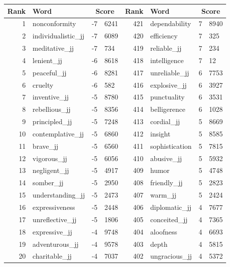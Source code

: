 \begin{table}[tbp]
    \begin{tabular}{| rlr@{.}l | rlr@{.}l |}
    \hline
    \textbf{Rank} & \textbf{Word} & \multicolumn{2}{c|}{\textbf{Score}} & \textbf{Rank} & \textbf{Word} & \multicolumn{2}{c|}{\textbf{Score}} \\
    \hline
    1 & nonconformity & -7 & 6241    &    421 & dependability & 7 & 8940 \\
    2 & individualistic\_jj & -7 & 6089    &    420 & efficiency & 7 & 325 \\
    3 & meditative\_jj & -7 & 734    &    419 & reliable\_jj & 7 & 234 \\
    4 & lenient\_jj & -6 & 8618    &    418 & intelligence & 7 & 12 \\
    5 & peaceful\_jj & -6 & 8281    &    417 & unreliable\_jj & 6 & 7753 \\
    6 & cruelty & -6 & 582    &    416 & explosive\_jj & 6 & 3927 \\
    7 & inventive\_jj & -5 & 8780    &    415 & punctuality & 6 & 3531 \\
    8 & rebellious\_jj & -5 & 8356    &    414 & belligerence & 6 & 1028 \\
    9 & principled\_jj & -5 & 7248    &    413 & cordial\_jj & 5 & 8669 \\
    10 & contemplative\_jj & -5 & 6860    &    412 & insight & 5 & 8585 \\
    11 & brave\_jj & -5 & 6560    &    411 & sophistication & 5 & 7815 \\
    12 & vigorous\_jj & -5 & 6056    &    410 & abusive\_jj & 5 & 5932 \\
    13 & negligent\_jj & -5 & 4917    &    409 & humor & 5 & 4748 \\
    14 & somber\_jj & -5 & 2950    &    408 & friendly\_jj & 5 & 2823 \\
    15 & understanding\_jj & -5 & 2473    &    407 & warm\_jj & 5 & 2424 \\
    16 & expressiveness & -5 & 2448    &    406 & diplomatic\_jj & 4 & 7677 \\
    17 & unreflective\_jj & -5 & 1806    &    405 & conceited\_jj & 4 & 7365 \\
    18 & expressive\_jj & -4 & 9748    &    404 & aloofness & 4 & 6693 \\
    19 & adventurous\_jj & -4 & 9578    &    403 & depth & 4 & 5815 \\
    20 & charitable\_jj & -4 & 7037    &    402 & ungracious\_jj & 4 & 5372 \\

\end{tabular}
\end{table}
